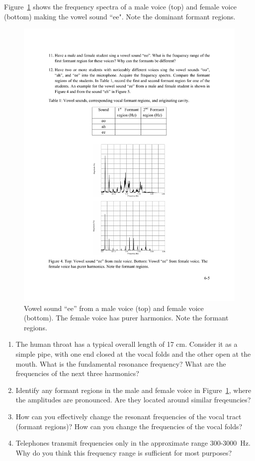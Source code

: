 \documentclass[11pt]{NSF}
\def\ben{\begin{enumerate}}
\def\een{\end{enumerate}}
\begin{document}
Figure~\ref{f:4} shows the frequency spectra of a male voice (top) 
and female voice (bottom) making the vowel sound ``ee".
Note the dominant formant regions.
%
\begin{figure}[hbtp]
\begin{center}
\includegraphics[width=.6\textwidth]{fig6_4}
\caption{Vowel sound ``ee” from a male voice (top) and 
female voice (bottom). 
The female voice has purer harmonics. 
Note the formant regions.}
\label{f:4}
\end{center}
\end{figure}

\ben

\item The human throat has a typical overall length of 17 cm. Consider
it as a simple pipe, with one end closed at the vocal folds and the
other open at the mouth. What is the fundamental resonance frequency?
What are the frequencies of the next three harmonics?

\item Identify any formant regions in the male and female voice in
Figure~\ref{f:4}, where the amplitudes are pronounced.
Are they located around similar freqeuncies?

\item How can you effectively change the resonant frequencies of the
vocal tract (formant regions)?
How can you change the frequencies of the vocal folds?

\item Telephones transmit frequencies only in the approximate range
300-3000~Hz. Why do you think this frequency range is 
sufficient for most purposes?

\een
\end{document}
